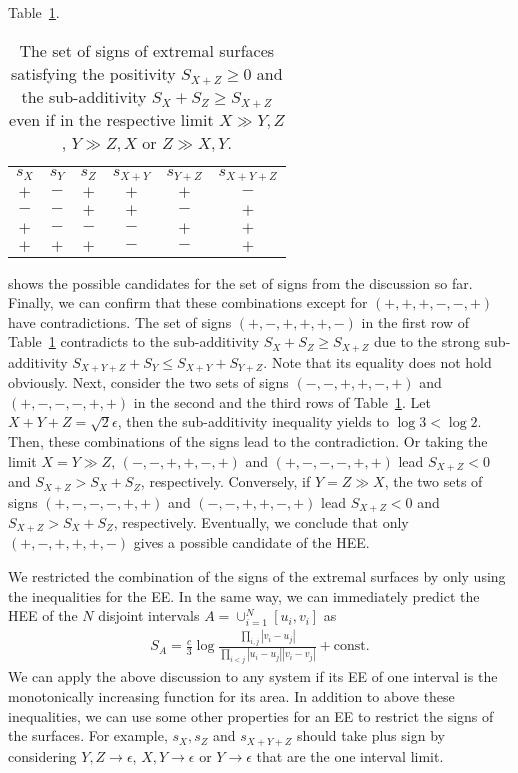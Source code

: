 \documentclass[%
 reprint,
 amsmath,amssymb,
 aps,
]{revtex4-2}
\begin{document}
    Table~\ref{tab:table1}.
\begin{table}[b]
\caption{\label{tab:table1}%
    The set of signs of extremal surfaces satisfying the positivity $S_{X+Z} \ge 0$ and the sub-additivity $S_{X} + S_{Z} \ge S_{X+Z}$ even if in the respective limit $X \gg Y,Z$, $Y \gg Z,X$ or $Z \gg X,Y$.
}
    \begin{ruledtabular}
        \begin{tabular}{cccccc}
        \textrm{$s_X$ }&
        \textrm{$s_Y$ }&
        \textrm{$s_Z$ }&
        \textrm{$s_{X+Y}$ }&
        \textrm{$s_{Y+Z}$ }&
        \textrm{$s_{X+Y+Z}$ }\\
        \colrule
        $+$ & $-$ & $+$ & $+$ & $+$ & $-$\\
        $-$ & $-$ & $+$ & $+$ & $-$ & $+$\\
        $+$ & $-$ & $-$ & $-$ & $+$ & $+$\\
        $+$ & $+$ & $+$ & $-$ & $-$ & $+$\\
        \end{tabular}
    \end{ruledtabular}
\end{table}
    shows the possible candidates for the set of signs from the discussion so far. Finally, we can confirm that these combinations except for $(+,+,+,-,-,+)$ have contradictions. The set of signs  $(+,-,+,+,+,-)$ in the first row of Table~\ref{tab:table1} contradicts to the sub-additivity $S_{X} + S_{Z} \ge S_{X+Z}$ due to the strong sub-additivity $S_{X+Y+Z}+S_{Y} \leq S_{X+Y} + S_{Y+Z}$. Note that its equality does not hold obviously. Next, consider the two sets of signs $(-,-,+,+,-,+)$ and $(+,-,-,-,+,+)$ in the second and the third rows of Table~\ref{tab:table1}. Let $X+Y+Z=\sqrt{2}\epsilon$, then the sub-additivity inequality yields to $\log 3 < \log 2$. Then, these combinations of the signs lead to the contradiction. Or taking the limit $X=Y \gg Z$, $(-,-,+,+,-,+)$ and $(+,-,-,-,+,+)$ lead $S_{X+Z}<0$ and $S_{X+Z}>S_X+S_Z$, respectively. Conversely, if $Y=Z \gg X$, the two sets of signs $(+,-,-,-,+,+)$ and $(-,-,+,+,-,+)$ lead $S_{X+Z}<0$ and $S_{X+Z}>S_X+S_Z$, respectively. Eventually, we conclude that only $(+,-,+,+,+,-)$ gives a possible candidate of the HEE. 
    

    We restricted the combination of the signs of the extremal surfaces by only using the inequalities for the EE. In the same way, we can immediately predict the HEE of the $N$ disjoint intervals $A = \cup_{i=1}^N [u_i,v_i]$ as
\begin{align}
    S_A = \frac{c}{3}  \log \frac{\prod_{i, j}|v_i-u_j|}{\prod_{i<j}|u_i-u_j||v_i-v_j|} + \mathrm{const.}
\end{align}
    We can apply the above discussion to any system if its EE of one interval is the monotonically increasing function for its area. In addition to above these inequalities, we can use some other properties for an EE to restrict the signs of the surfaces. For example, $s_{X}, s_{Z}$ and $s_{X+Y+Z}$ should take plus sign by considering $Y,Z \to \epsilon$, $X,Y \to \epsilon$ or $Y \to \epsilon$ that are the one interval limit. 
\end{document}
